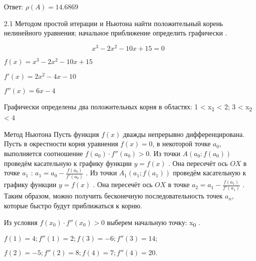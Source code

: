 \documentclass[10pt, a4paper]{scrartcl}
\begin{document}
Ответ: \(\displaystyle \rho (A) = 14.6869\)

\pagebreak

2.1 Методом простой итерации и Ньютона найти положительный корень
нелинейного уравнения; начальное приближение определить графически .

\[x^3 - 2x^2 - 10x + 15 = 0\]

\begin{center}
\end{center}

\(\displaystyle f(x) = x^3 - 2x^2 - 10x + 15\)

\(\displaystyle f'(x) = 2x^2 - 4x - 10\)

\(\displaystyle f''(x) = 6x - 4\)

Графически определены два положительных корня в областях: 1 \textless{}
x\textsubscript{1} \textless{} 2; 3 \textless{} x\textsubscript{2}
\textless{} 4

Метод Ньютона Пусть функция \(f(x)\) дважды непрерывно дифференцирована.
Пусть в окрестности корня уравнения \(f(x)=0\), в некоторой точке
\(a_0\), выполняется соотношение \(f(a_0)\cdot f''(a_0) >0\). Из точки
\(A(a_0:f(a_0))\) проведём касательную к графику функции \(y=f(x)\) .
Она пересечёт ось \(OX\) в точке \(a_1\) :
\(a_1 = a_0 - \frac{f(a_0)}{f'(a_0)}\) . Из точки \(A_1(a_1;f(a_1))\)
проведём касательную к графику функции \(y=f(x)\) . Она пересечёт ось
\(OX\) в точке \(a_2 = a_1 - \frac{f(a_1)}{f'(a_1)}\) . Таким образом,
можно получить бесконечную последовательность точек \(a_n\), которые
быстро будут приближаться к корню.

\vspace{5mm}

Из условия \(f(x_0) \cdot f''(x_0) > 0\) выберем начальную точку:
x\textsubscript{0} .

\(\displaystyle f(1) = 4; f''(1) = 2; f(3) = -6; f''(3) = 14;\)

\(\displaystyle f(2) = -5; f''(2) = 8; f(4) = 7; f''(4) = 20.\)
\end{document}

